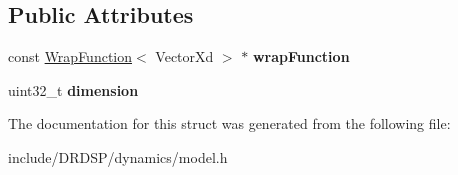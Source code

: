 \subsection*{Public Attributes}
\begin{DoxyCompactItemize}
\item 
\hypertarget{struct_d_r_d_s_p_1_1_model_c_w_ae05ac52c41fef18a0285344ba7a795fb}{const \hyperlink{struct_d_r_d_s_p_1_1_wrap_function}{Wrap\-Function}$<$ Vector\-Xd $>$ $\ast$ {\bfseries wrap\-Function}}\label{struct_d_r_d_s_p_1_1_model_c_w_ae05ac52c41fef18a0285344ba7a795fb}

\item 
\hypertarget{struct_d_r_d_s_p_1_1_model_c_w_adf7c5e5a8f7e2b277ec6df7df675d582}{uint32\-\_\-t {\bfseries dimension}}\label{struct_d_r_d_s_p_1_1_model_c_w_adf7c5e5a8f7e2b277ec6df7df675d582}

\end{DoxyCompactItemize}


The documentation for this struct was generated from the following file\-:\begin{DoxyCompactItemize}
\item 
include/\-D\-R\-D\-S\-P/dynamics/model.\-h\end{DoxyCompactItemize}
